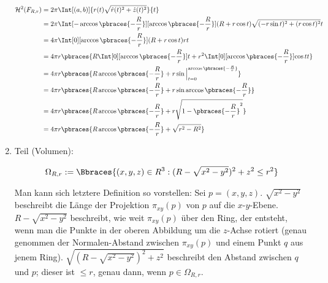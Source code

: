 \begin{solution}
\begin{enumerate}[label = \arabic*.]
    \begin{align*}
        \mathcal{H}^2(F_{R, r})
        & =
        2 \pi
        \Int[(a, b)]{r(t) \sqrt{\dot r(t)^2 + \dot z(t)^2}}{t} \\
        & =
        2 \pi
        \Int
        [-\arccos \pbraces{-\frac{R}{r}}]
        [ \arccos \pbraces{-\frac{R}{r}}]
        {
            (R + r \cos t)
            \sqrt
            {
                (-r \sin t)^2
                +
                ( r \cos t)^2
            }
        }{t} \\
        & =
        4 \pi
        \Int[0][\arccos \pbraces{-\frac{R}{r}}]
        {
            (R + r \cos t) r
        }{t} \\
        & =
        4 \pi r
        \pbraces
        {
            R
            \Int[0][\arccos \pbraces{-\frac{R}{r}}]{}{t}
            +
            r^2
            \Int[0][\arccos \pbraces{-\frac{R}{r}}]
            {
                \cos t
            }{t}
        } \\
        & =
        4 \pi r
        \pbraces
        {
            R
            \arccos \pbraces{-\frac{R}{r}}
            +
            r
            \sin \Big |_{t = 0}^{\arccos \pbraces{-\frac{R}{r}}}
        } \\
        & =
        4 \pi r
        \pbraces
        {
            R
            \arccos \pbraces{-\frac{R}{r}}
            +
            r
            \sin \arccos \pbraces{-\frac{R}{r}}
        } \\
        & =
        4 \pi r
        \pbraces
        {
            R
            \arccos \pbraces{-\frac{R}{r}}
            +
            r
            \sqrt{1 - \pbraces{-\frac{R}{r}}^2}
        } \\
        & =
        4 \pi r
        \pbraces
        {
            R
            \arccos \pbraces{-\frac{R}{r}}
            +
            \sqrt{r^2 - R^2}
        }
    \end{align*}

    \item Teil (Volumen):
    
    \begin{align*}
        \Omega_{R, r}
        :=
        \Bbraces
        {
            (x, y, z) \in R^3:
            (R - \sqrt{x^2 - y^2})^2 + z^2 \leq r^2
        }
    \end{align*}

    Man kann sich letztere Definition so vorstellen:
    Sei $p = (x, y, z)$.
    $\sqrt{x^2 - y^2}$ beschreibt die Länge der Projektion $\pi_{x y}(p)$ von $p$ auf die $x$-$y$-Ebene.
    $R - \sqrt{x^2 - y^2}$ beschreibt, wie weit $\pi_{x y}(p)$ über den Ring, der entsteht, wenn man die Punkte in der oberen Abbildung um die $z$-Achse rotiert (genau genommen der Normalen-Abstand zwischen $\pi_{x y}(p)$ und einem Punkt $q$ aus jenem Ring).
    $\sqrt{(R - \sqrt{x^2 - y^2})^2 + z^2}$ beschreibt den Abstand zwischen $q$ und $p$; dieser ist $\leq r$, genau dann, wenn $p \in \Omega_{R, r}$.


\end{enumerate}
\end{solution}
